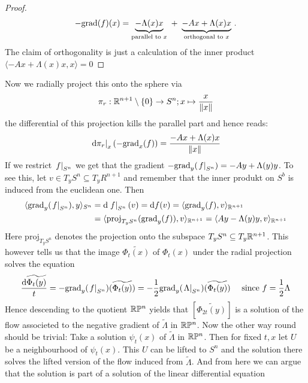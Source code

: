 \begin{example}
\begin{proof}
		\begin{equation*}
			-\mathrm{grad}(f)(x)=\underbrace{-\Lambda(x)x}_{\text{parallel to } x}~+~\underbrace{-Ax+\Lambda(x)x}_{\text{orthogonal to }x}\,.
		\end{equation*} The claim of orthogonality is just a calculation of the inner product $\langle -Ax+\Lambda(x)x,x\rangle=0$
		\end{proof} Now we radially project this onto the sphere via 
		\begin{equation*}
			\pi_r:\mathbb{R}^{n+1}\setminus\{0\}\to S^n; x\mapsto \frac{x}{\left\lVert x\right\rVert}
		\end{equation*} the differential of this projection kills the parallel part and hence reads:
		\begin{equation*}
			\left.\mathop{}\!\mathrm{d} \pi_r\right|_{x}(-\mathrm{grad}_x(f))=\frac{-Ax+\Lambda(x)x}{\left\lVert x\right\rVert}
		\end{equation*} If we restrict $\left.f\right|_{S^n}$ we get that the gradient $-\mathrm{grad}_y(\left.f\right|_{S^n})=-Ay+\Lambda(y)y$. To see this, let $v\in T_yS^n\subseteq T_yR^{n+1}$ and remember that the inner produkt on $S^b$ is induced from the euclidean one. Then 
		\begin{align*}
			\langle \mathrm{grad}_y(\left.f\right|_{S^n}),y\rangle_{S^n}
			&=\mathop{}\!\mathrm{d} \left.f\right|_{S^n}(v)=\mathop{}\!\mathrm{d} f(v)=\langle \mathrm{grad}_y(f),v\rangle_{\mathbb{R}^{n+1}}\\
			&=\langle \mathrm{proj}_{T_yS^n}(\mathrm{grad}_y(f)),v\rangle_{\mathbb{R}^{n+1}}=\langle Ay-\Lambda(y)y,v \rangle_{\mathbb{R}^{n+1}}
		\end{align*} Here $\mathrm{proj}_{T_yS^n}$ denotes the projection onto the subspace ${T_yS^n}\subseteq T_y\mathbb{R}^{n+1}$. This however tells us that the image $\widetilde{\Phi_t(x)}$ of $\Phi_t(x)$ under the radial projection solves the equation
		\begin{equation*}
			\frac{\mathop{}\!\mathrm{d} \widetilde{\Phi_t(y)}}{t}=-\mathrm{grad}_y(\left.f\right|_{S^n})(\widetilde{\Phi_t(y)})=-\frac{1}{2}\mathrm{grad}_y(\left.\Lambda\right|_{S^n})(\widetilde{\Phi_t(y)})\quad \text{ since } f=\frac{1}{2}\Lambda
		\end{equation*} Hence descending to the quotient $\mathbb{R}\mathbb{P}^n$ yields that $\left[\widetilde{\Phi_{2t}(y)}\right]$ is a solution of the flow associeted to the negative gradient of $\tilde{\Lambda}$ in $\mathbb{R}\mathbb{P}^n$. Now the other way round should be trivial: Take a solution $\psi_t(x)$ of $\tilde{\Lambda}$ in $\mathbb{R}\mathbb{P}^n$. Then for fixed $t,x$ let $U$ be a neighbourhood of $\psi_t(x)$. This $U$ can be lifted to $S^n$ and the solution there solves the lifted version of the flow induced from $\tilde{\Lambda}$. And from here we can argue that the solution is part of a solution of the linear differential equation 

\end{example}
